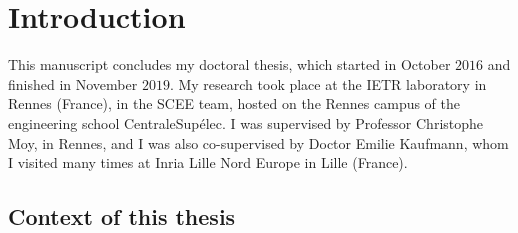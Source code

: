 
\chapter{Introduction}
\label{chapter:1}




\graphicspath{{2-Chapters/1-Chapter/Images/}}

%
This manuscript concludes my doctoral thesis, which started in October $2016$ and finished in November $2019$.
My research took place at the IETR laboratory in Rennes (France), in the SCEE team, hosted on the Rennes campus of the engineering school CentraleSupélec.
I was supervised by Professor Christophe Moy, in Rennes,
and I was also co-supervised by Doctor Emilie Kaufmann, whom I visited many times at Inria Lille Nord Europe in Lille (France).


\section{Context of this thesis}
\label{sec:1:problems}

